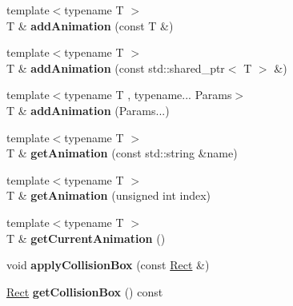 \begin{DoxyCompactItemize}
\item 
\mbox{\label{classbkengine_1_1Element_a61332cf910adfc845cee4bb9342d09dc}} 
{\footnotesize template$<$typename T $>$ }\\T \& {\bfseries add\+Animation} (const T \&)
\item 
\mbox{\label{classbkengine_1_1Element_a38953a80531b2f444b61b7c400983bf1}} 
{\footnotesize template$<$typename T $>$ }\\T \& {\bfseries add\+Animation} (const std\+::shared\+\_\+ptr$<$ T $>$ \&)
\item 
\mbox{\label{classbkengine_1_1Element_a32ae4ca339295c8f78c7e09297f74557}} 
{\footnotesize template$<$typename T , typename... Params$>$ }\\T \& {\bfseries add\+Animation} (Params...)
\item 
\mbox{\label{classbkengine_1_1Element_a8884f71bdf7e36f9354c74db725ab8e1}} 
{\footnotesize template$<$typename T $>$ }\\T \& {\bfseries get\+Animation} (const std\+::string \&name)
\item 
\mbox{\label{classbkengine_1_1Element_a459cbd687eb823c2de05923b85ba1a05}} 
{\footnotesize template$<$typename T $>$ }\\T \& {\bfseries get\+Animation} (unsigned int index)
\item 
\mbox{\label{classbkengine_1_1Element_aa35ae3f7cd4d10b3facdebee044ed7df}} 
{\footnotesize template$<$typename T $>$ }\\T \& {\bfseries get\+Current\+Animation} ()
\item 
\mbox{\label{classbkengine_1_1Element_a4c356c014cd8e6e75c7299d30fd4f656}} 
void {\bfseries apply\+Collision\+Box} (const \hyperlink{structbkengine_1_1Rect}{Rect} \&)
\item 
\mbox{\label{classbkengine_1_1Element_a665948ae462526e85c3415bc4a787bf9}} 
\hyperlink{structbkengine_1_1Rect}{Rect} {\bfseries get\+Collision\+Box} () const
\item 

\end{DoxyCompactItemize}
